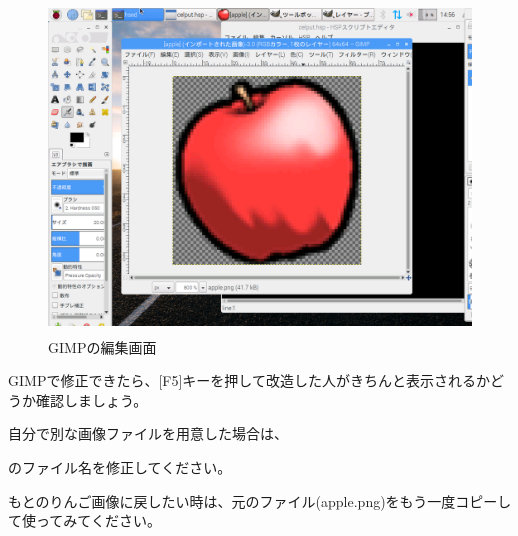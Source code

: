 \begin{figure}[H]
    \begin{center}
      \includegraphics[keepaspectratio,width=11.712cm,height=8.784cm]{text04-img/s_gimpedit.png}
      \caption{GIMPの編集画面}
    \end{center}
    \label{fig:prog_menu}
\end{figure}

\begin{description}
    \item {}
\end{description}



GIMPで修正できたら、[F5]キーを押して改造した人がきちんと表示されるかどうか確認しましょう。

自分で別な画像ファイルを用意した場合は、

\begin{description}
    \item {}
\end{description}


のファイル名を修正してください。

もとのりんご画像に戻したい時は、元のファイル(apple.png)をもう一度コピーして使ってみてください。



